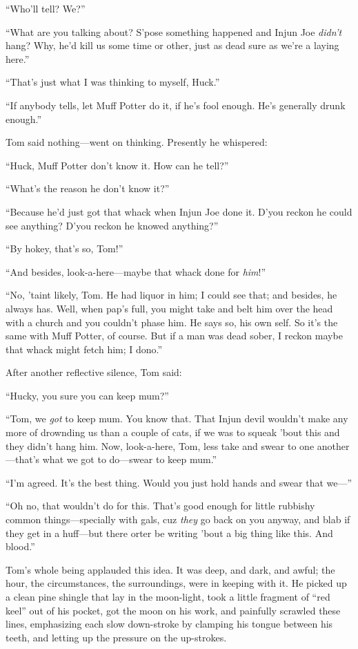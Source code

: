 \documentclass{book}
\begin{document}
“Who’ll tell? We?”

“What are you talking about? S’pose something happened and Injun Joe \emph{didn’t} hang? Why, he’d kill us some time or other, just as dead sure as we’re a laying here.”

“That’s just what I was thinking to myself, Huck.”

“If anybody tells, let Muff Potter do it, if he’s fool enough. He’s generally drunk enough.”

Tom said nothing—went on thinking. Presently he whispered:

“Huck, Muff Potter don’t know it. How can he tell?”

“What’s the reason he don’t know it?”

“Because he’d just got that whack when Injun Joe done it. D’you reckon he could see anything? D’you reckon he knowed anything?”

“By hokey, that’s so, Tom!”

“And besides, look-a-here—maybe that whack done for \emph{him}!”

“No, ’taint likely, Tom. He had liquor in him; I could see that; and besides, he always has. Well, when pap’s full, you might take and belt him over the head with a church and you couldn’t phase him. He says so, his own self. So it’s the same with Muff Potter, of course. But if a man was dead sober, I reckon maybe that whack might fetch him; I dono.”

After another reflective silence, Tom said:

“Hucky, you sure you can keep mum?”

“Tom, we \emph{got} to keep mum. You know that. That Injun devil wouldn’t make any more of drownding us than a couple of cats, if we was to squeak ’bout this and they didn’t hang him. Now, look-a-here, Tom, less take and swear to one another—that’s what we got to do—swear to keep mum.”

“I’m agreed. It’s the best thing. Would you just hold hands and swear that we—”

“Oh no, that wouldn’t do for this. That’s good enough for little rubbishy common things—specially with gals, cuz \emph{they} go back on you anyway, and blab if they get in a huff—but there orter be writing ’bout a big thing like this. And blood.”

Tom’s whole being applauded this idea. It was deep, and dark, and awful; the hour, the circumstances, the surroundings, were in keeping with it. He picked up a clean pine shingle that lay in the moon-light, took a little fragment of “red keel” out of his pocket, got the moon on his work, and painfully scrawled these lines, emphasizing each slow down-stroke by clamping his tongue between his teeth, and letting up the pressure on the up-strokes.
\end{document}
